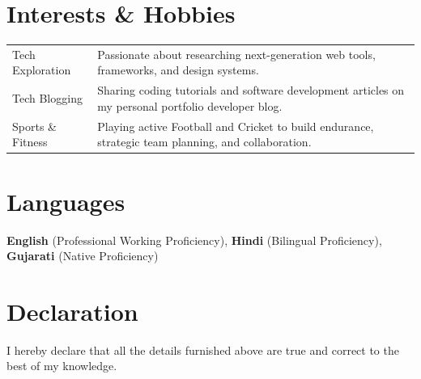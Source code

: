 \documentclass[a4paper,10pt]{article}
\begin{document}
\section{Interests \& Hobbies}
\begin{tabularx}{\linewidth}{@{}l X@{}}
Tech Exploration & Passionate about researching next-generation web tools, frameworks, and design systems. \\
Tech Blogging & Sharing coding tutorials and software development articles on my personal portfolio developer blog. \\
Sports \& Fitness & Playing active Football and Cricket to build endurance, strategic team planning, and collaboration.
\end{tabularx}

\section{Languages}
\small{\textbf{English} (Professional Working Proficiency), \textbf{Hindi} (Bilingual Proficiency), \textbf{Gujarati} (Native Proficiency)}

\section{Declaration}
\small{I hereby declare that all the details furnished above are true and correct to the best of my knowledge.}
\end{document}

